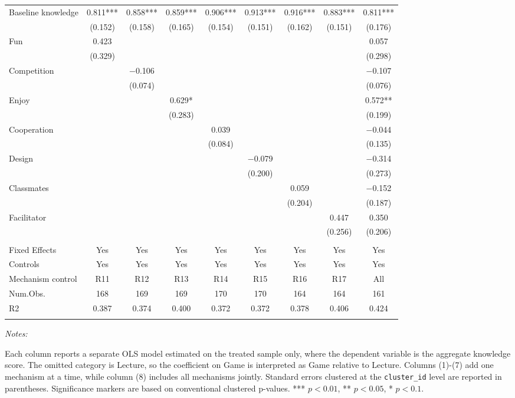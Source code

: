 \begin{table}[htbp]
\begin{tabular}{lcccccccc}
Baseline knowledge & \num{0.811}*** & \num{0.858}*** & \num{0.859}*** & \num{0.906}*** & \num{0.913}*** & \num{0.916}*** & \num{0.883}*** & \num{0.811}*** \\
 & (\num{0.152}) & (\num{0.158}) & (\num{0.165}) & (\num{0.154}) & (\num{0.151}) & (\num{0.162}) & (\num{0.151}) & (\num{0.176}) \\
Fun & \num{0.423} &  &  &  &  &  &  & \num{0.057} \\
 & (\num{0.329}) &  &  &  &  &  &  & (\num{0.298}) \\
Competition &  & \num{-0.106} &  &  &  &  &  & \num{-0.107} \\
 &  & (\num{0.074}) &  &  &  &  &  & (\num{0.076}) \\
Enjoy &  &  & \num{0.629}* &  &  &  &  & \num{0.572}** \\
 &  &  & (\num{0.283}) &  &  &  &  & (\num{0.199}) \\
Cooperation &  &  &  & \num{0.039} &  &  &  & \num{-0.044} \\
 &  &  &  & (\num{0.084}) &  &  &  & (\num{0.135}) \\
Design &  &  &  &  & \num{-0.079} &  &  & \num{-0.314} \\
 &  &  &  &  & (\num{0.200}) &  &  & (\num{0.273}) \\
Classmates &  &  &  &  &  & \num{0.059} &  & \num{-0.152} \\
 &  &  &  &  &  & (\num{0.204}) &  & (\num{0.187}) \\
Facilitator &  &  &  &  &  &  & \num{0.447} & \num{0.350} \\
 &  &  &  &  &  &  & (\num{0.256}) & (\num{0.206}) \\
\\
\hline
\rule{0pt}{1.2em}Fixed Effects & Yes & Yes & Yes & Yes & Yes & Yes & Yes & Yes \\
Controls & Yes & Yes & Yes & Yes & Yes & Yes & Yes & Yes \\
Mechanism control & R11 & R12 & R13 & R14 & R15 & R16 & R17 & All \\
Num.Obs. & \num{168} & \num{169} & \num{169} & \num{170} & \num{170} & \num{164} & \num{164} & \num{161} \\
R2 & \num{0.387} & \num{0.374} & \num{0.400} & \num{0.372} & \num{0.372} & \num{0.378} & \num{0.406} & \num{0.424} \\
\\
\bottomrule
\hline
\hline
\end{tabular}
{\begin{flushleft}\parbox{\textwidth}{\tiny \hspace*{0.1cm}
\textit{Notes:}} Each column reports a separate OLS model estimated on the treated sample only, where the dependent variable is the aggregate knowledge score. The omitted category is Lecture, so the coefficient on Game is interpreted as Game relative to Lecture. Columns (1)-(7) add one mechanism at a time, while column (8) includes all mechanisms jointly. Standard errors clustered at the \texttt{cluster\_id} level are reported in parentheses. Significance markers are based on conventional clustered p-values. *** $p < 0.01$, ** $p < 0.05$, * $p < 0.1$.
\end{flushleft}}
\end{table}

